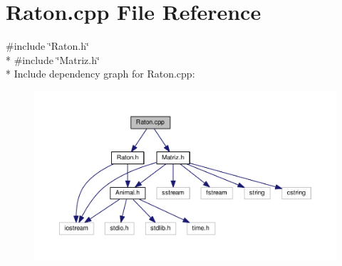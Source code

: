 \section{Raton.\-cpp File Reference}
\label{_raton_8cpp}
{\ttfamily \#include \char`\"{}Raton.\-h\char`\"{}}\\*
{\ttfamily \#include \char`\"{}Matriz.\-h\char`\"{}}\\*
Include dependency graph for Raton.\-cpp\-:
\nopagebreak
\begin{figure}[H]
\begin{center}
\leavevmode
\includegraphics[width=350pt]{_raton_8cpp__incl}
\end{center}
\end{figure}

